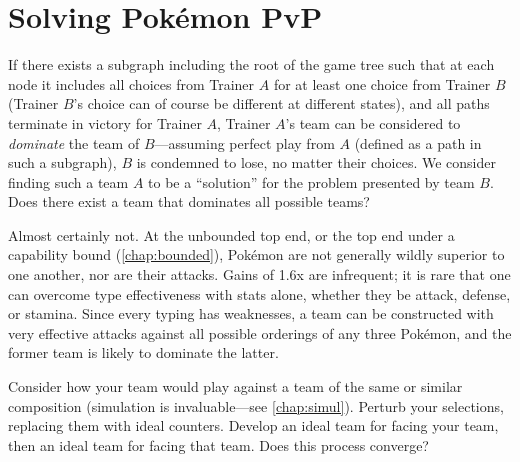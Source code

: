 \section{Solving Pokémon PvP}
If there exists a subgraph including the root of the game tree such that at each
  node it includes all choices from Trainer $A$ for at least one choice from Trainer $B$
  (Trainer $B$'s choice can of course be different at different states), and all
  paths terminate in victory for Trainer $A$, Trainer $A$'s team can be considered
  to \textit{dominate} the team of $B$---assuming perfect play from $A$ (defined
  as a path in such a subgraph), $B$ is condemned to lose, no matter their choices.
We consider finding such a team $A$ to be a ``solution'' for the problem presented
  by team $B$.
Does there exist a team that dominates all possible teams?

Almost certainly not.
At the unbounded top end, or the top end under a capability bound (\autoref{chap:bounded}), Pokémon are not generally
  wildly superior to one another, nor are their attacks.
Gains of 1.6x are infrequent; it is rare that one can overcome type
  effectiveness with stats alone, whether they be attack, defense, or stamina.
Since every typing has weaknesses, a team can be constructed with
  very effective attacks against all possible orderings of any three Pokémon,
  and the former team is likely to dominate the latter.

Consider how your team would play against a team of the same or similar composition (simulation
  is invaluable---see \autoref{chap:simul}).
Perturb your selections, replacing them with ideal counters.
Develop an ideal team for facing your team, then an ideal team for facing that team.
Does this process converge?
